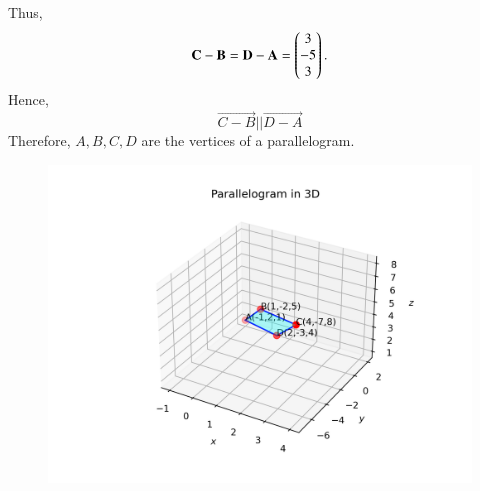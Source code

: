 \documentclass[journal]{IEEEtran}
\begin{document}
Thus,
\begin{align}
	\mathbf{C - B}= \mathbf{D - A} = \begin{pmatrix}3 \\ -5 \\ 3\end{pmatrix}.
\end{align}
Hence,
\[ \vec{C - B} ||\vec{D - A }\] 
\bigskip
\noindent
Therefore, $A, B, C, D$ are the vertices of a parallelogram.

\begin{figure}[H]
    \centering
	\includegraphics[width=1\textwidth]{img.png}
	    \caption{}
    \label{img}
    \end{figure}
\end{document}
